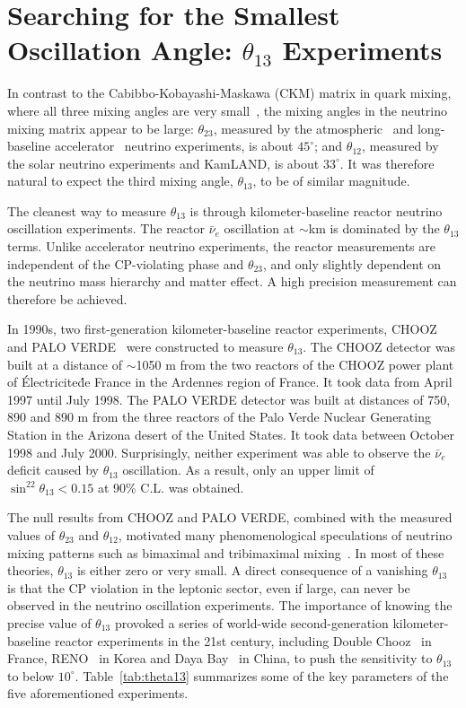 \section{Searching for the Smallest Oscillation Angle: $\theta_{13}$ Experiments} 
\label{sec:theta13}
In contrast to the  Cabibbo-Kobayashi-Maskawa (CKM) matrix in quark mixing, where all three mixing angles are very small~\cite{PDG14}, the mixing angles in the neutrino mixing matrix appear to be large: $\theta_{23}$, measured by the atmospheric~\cite{Kajita} and long-baseline accelerator~\cite{Feldman} neutrino experiments, is about $45^\circ$; and $\theta_{12}$, measured by the solar neutrino experiments and KamLAND, is about $33^\circ$. It was therefore natural to expect the third mixing angle, $\theta_{13}$, to be of similar magnitude.

The cleanest way to measure $\theta_{13}$ is through kilometer-baseline reactor neutrino oscillation experiments. The reactor $\bar\nu_e$ oscillation at $\sim$km is dominated by the $\theta_{13}$ terms. Unlike accelerator neutrino experiments, the reactor measurements are independent of the CP-violating phase and $\theta_{23}$, and only slightly dependent on the neutrino mass hierarchy and matter effect. A high precision measurement can therefore be achieved.

In 1990s, two first-generation kilometer-baseline reactor experiments, CHOOZ~\cite{Chooz} and PALO VERDE~\cite{Paloverde} were constructed to measure $\theta_{13}$. 
The CHOOZ detector was built at a distance of $\sim$1050 m from the two reactors of the CHOOZ power plant of \'{E}lectricite\'{d}e France in the Ardennes region of France. It took data from April 1997 until July 1998. 
The PALO VERDE detector was built at distances of 750, 890 and 890 m from the three reactors of the Palo Verde Nuclear Generating Station in the Arizona desert of the United States. It took data between October 1998 and July 2000. 
Surprisingly, neither experiment was able to observe the $\bar\nu_e$ deficit caused by $\theta_{13}$ oscillation. 
As a result, only an upper limit of $\sin^22\theta_{13} < 0.15$ at 90\% C.L. was obtained.

The null results from CHOOZ and PALO VERDE, combined with the measured values of $\theta_{23}$ and $\theta_{12}$, motivated many phenomenological speculations of neutrino mixing patterns such as bimaximal and tribimaximal mixing~\cite{Harrison,Altarelli}. 
In most of these theories, $\theta_{13}$ is either zero or very small. 
A direct consequence of a vanishing $\theta_{13}$ is that the CP violation in the leptonic sector, even if large, can never be observed in the neutrino oscillation experiments. 
The importance of knowing the precise value of $\theta_{13}$ provoked a series of world-wide second-generation kilometer-baseline reactor experiments in the 21st century, including Double Chooz~\cite{DChooz} in France, RENO~\cite{Reno} in Korea and Daya Bay~\cite{Dayabay} in China, to push the sensitivity to $\theta_{13}$ to below $10^\circ$. 
Table~\ref{tab:theta13} summarizes some of the key parameters of the five aforementioned experiments.

